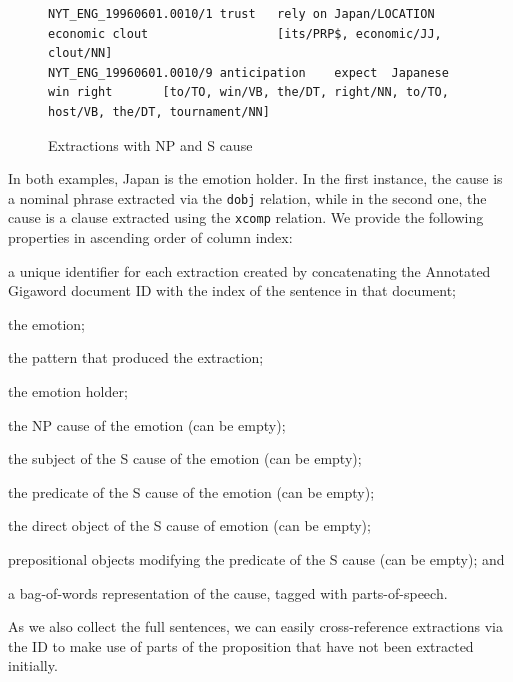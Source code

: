 \begin{figure}
\begin{lstlisting}
NYT_ENG_19960601.0010/1	trust	rely on	Japan/LOCATION	economic clout					[its/PRP$, economic/JJ, clout/NN]
NYT_ENG_19960601.0010/9	anticipation	expect	Japanese				win	right		[to/TO, win/VB, the/DT, right/NN, to/TO, host/VB, the/DT, tournament/NN]
\end{lstlisting}
\caption{Extractions with NP and S cause}\label{fig:extractions}
\end{figure}

In both examples, Japan is the emotion holder. In the first instance, the cause is a nominal phrase extracted via the \texttt{dobj} relation, while in the second one, the cause is a clause extracted using the \texttt{xcomp} relation. We provide the following properties in ascending order of column index:

\begin{aenumerate}
	\item a unique identifier for each extraction created by concatenating the Annotated Gigaword document ID with the index of the sentence in that document;
	\item the emotion;
	\item the pattern that produced the extraction;
	\item the emotion holder;
	\item the NP cause of the emotion (can be empty);
	\item the subject of the S cause of the emotion (can be empty);
	\item the predicate of the S cause of the emotion (can be empty);
	\item the direct object of the S cause of emotion (can be empty);
	\item prepositional objects modifying the predicate of the S cause (can be empty); and
	\item a bag-of-words representation of the cause, tagged with parts-of-speech.
\end{aenumerate}

As we also collect the full sentences, we can easily cross-reference extractions via the ID to make use of parts of the proposition that have not been extracted initially.